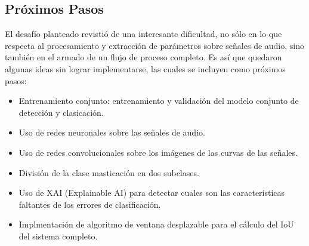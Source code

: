 \documentclass[11pt]{charter}
\begin{document}
\subsection{Próximos Pasos}
El desafío planteado revistió de una interesante dificultad, no sólo en lo que respecta al procesamiento y extracción de parámetros sobre señales de audio, sino también en el armado de un flujo de proceso completo. Es así que quedaron algunas ideas sin lograr implementarse, las cuales se incluyen como próximos pasos:
\begin{itemize}
	\item Entrenamiento conjunto: entrenamiento y validación del modelo conjunto de detección y clasicación.
	\item Uso de redes neuronales sobre las señales de audio.
	\item Uso de redes convolucionales sobre los imágenes de las curvas de las señales.
	\item División de la clase masticación en dos subclases.
	\item Uso de XAI (Explainable AI) para detectar cuales son las características faltantes de los errores de clasificación.
	\item Implmentación de algoritmo de ventana desplazable para el cálculo del IoU del sistema completo.
\end{itemize}
\end{document}
